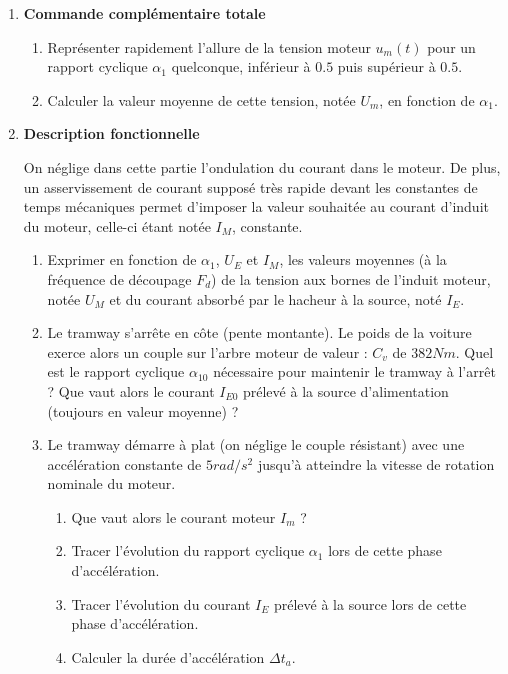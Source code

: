 \begin{enumerate}
\item \textbf{Commande complémentaire totale}

\begin{enumerate}
\item Représenter rapidement l'allure de la tension moteur $u_m(t)$ pour un rapport cyclique $\alpha_1$ quelconque, inférieur à $0.5$ puis supérieur à $0.5$.
\item Calculer la valeur moyenne de cette tension, notée $U_m$, en fonction de $\alpha_1$.
\end{enumerate}

\item\textbf{Description fonctionnelle}

On néglige dans cette partie l’ondulation du courant dans le moteur. De plus, un asservissement de courant supposé très rapide devant les constantes de temps mécaniques permet d’imposer la valeur souhaitée au courant d’induit du moteur, celle-ci étant notée $I_M$, constante.

\begin{enumerate}
\item Exprimer en fonction de $\alpha_1$, $U_E$ et $I_M$, les valeurs moyennes (à la fréquence de découpage $F_d$) de la tension aux bornes de l'induit moteur, notée $U_M$ et du courant absorbé par le hacheur à la source, noté $I_E$.
\item Le tramway s’arrête en côte (pente montante). Le poids de la voiture exerce alors un couple sur l’arbre moteur de valeur : $C_v$ de $382 Nm$. Quel est le rapport cyclique $\alpha_{10}$ nécessaire pour maintenir le tramway à l’arrêt ? Que vaut alors le courant $I_{E0}$ prélevé à la source d’alimentation (toujours en valeur moyenne) ?
\item Le tramway démarre à plat (on néglige le couple résistant) avec une accélération constante de $5 rad/s^2$ jusqu'à atteindre la vitesse de rotation nominale du moteur. 

\begin{enumerate}
\item Que vaut alors le courant moteur $I_m$ ?
\item Tracer l'évolution du rapport cyclique $\alpha_{1}$ lors de cette phase d'accélération.
\item Tracer l'évolution du courant $I_E$ prélevé à la source lors de cette phase d'accélération.
\item Calculer la durée d'accélération $\Delta t_a$.
\end{enumerate}


\end{enumerate}
\end{enumerate}
